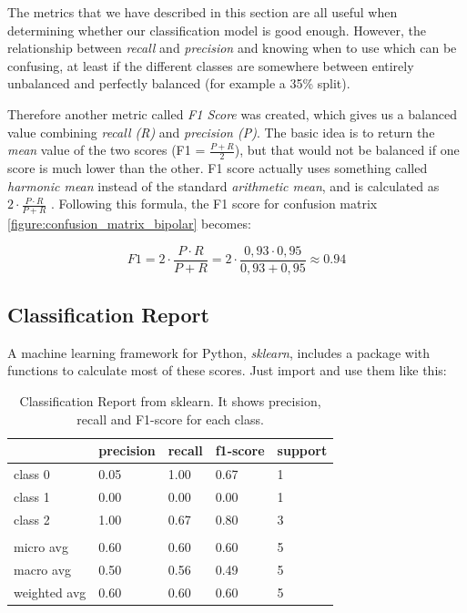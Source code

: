 The metrics that we have described in this section are all useful when determining whether our classification model is good enough. However, the relationship between \textit{recall} and \textit{precision} and knowing when to use which can be confusing, at least if the different classes are somewhere between entirely unbalanced and perfectly balanced (for example a 35\% split). 

Therefore another metric called \textit{F1 Score} was created, which gives us a balanced value combining \textit{recall (R)} and \textit{precision (P)}. The basic idea is to return the \textit{mean} value of the two scores (F1 = $ \frac{P + R}{2} $), but that would not be balanced if one score is much lower than the other. F1 score actually uses something called \textit{harmonic mean} instead of the standard \textit{arithmetic mean}, and is calculated as $ 2 \cdot \frac{P \cdot R}{P + R} $ \cite{ml_metrics}. 
Following this formula, the F1 score for confusion matrix \ref{figure:confusion_matrix_bipolar} becomes:

\[
  F1 = 2 \cdot \frac{P \cdot R}{P + R} = 2 \cdot \frac{0,93 \cdot 0,95}{0,93 + 0,95} \approx 0.94
\]

\subsection{Classification Report}

A machine learning framework for Python, \textit{sklearn}, includes a package with functions to calculate most of these scores. Just import and use them like this: 



\begin{table}[h]
\begin{center}
  \begin{tabular}{| l | l | l | l | l |}
    \hline
                  & precision & recall  & f1-score & support \\ \hline
    class 0       & 0.05      & 1.00    & 0.67     & 1       \\
    class 1       & 0.00      & 0.00    & 0.00     & 1       \\
    class 2       & 1.00      & 0.67    & 0.80     & 3       \\
                  &           &         &          &         \\ 
    micro avg     & 0.60      & 0.60    & 0.60     & 5       \\
    macro avg     & 0.50      & 0.56    & 0.49     & 5       \\
    weighted avg  & 0.60      & 0.60    & 0.60     & 5       \\
    \hline
  \end{tabular}
  \caption{Classification Report from sklearn. It shows precision, recall and F1-score for each class.}
  \label{table:classification_report}
\end{center}
\end{table}

